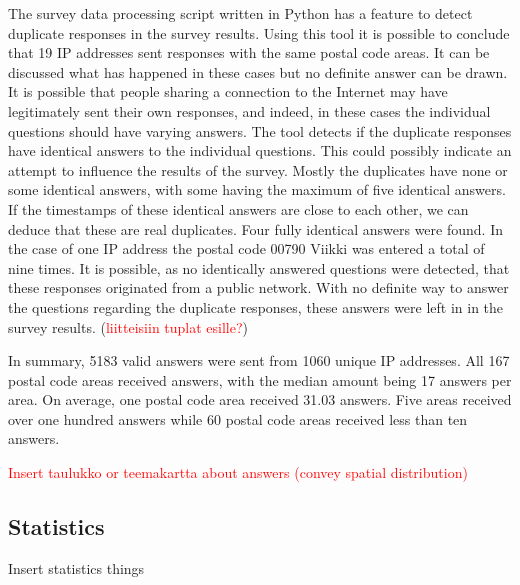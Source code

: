 The survey data processing script written in Python has a feature to detect duplicate responses in the survey results. Using this tool it is possible to conclude that 19 IP addresses sent responses with the same postal code areas. It can be discussed what has happened in these cases but no definite answer can be drawn. It is possible that people sharing a connection to the Internet may have legitimately sent their own responses, and indeed, in these cases the individual questions should have varying answers. The tool detects if the duplicate responses have identical answers to the individual questions. This could possibly indicate an attempt to influence the results of the survey. Mostly the duplicates have none or some identical answers, with some having the maximum of five identical answers. If the timestamps of these identical answers are close to each other, we can deduce that these are real duplicates. Four fully identical answers were found. In the case of one IP address the postal code 00790 Viikki was entered a total of nine times. It is possible, as no identically answered questions were detected, that these responses originated from a public network. With no definite way to answer the questions regarding the duplicate responses, these answers were left in in the survey results. (\textcolor{red}{liitteisiin tuplat esille?})

In summary, 5183 valid answers were sent from 1060 unique IP addresses. All 167 postal code areas received answers, with the median amount being 17 answers per area. On average, one postal code area received 31.03 answers. Five areas received over one hundred answers while 60 postal code areas received less than ten answers.

\textcolor{red}{Insert taulukko or teemakartta about answers (convey spatial distribution)}

\subsection{Statistics}
\justify
Insert statistics things